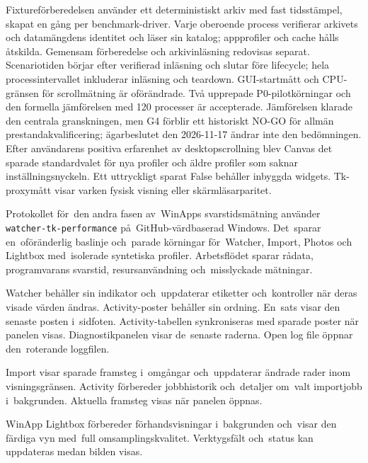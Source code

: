 \documentclass[11pt,a4paper]{article}
\newcommand{\codeword}[1]{\nolinkurl{#1}}
\begin{document}
Fixtureförberedelsen använder ett deterministiskt arkiv med fast tidsstämpel,
skapat en gång per benchmark-driver. Varje oberoende process verifierar arkivets
och datamängdens identitet och läser sin katalog; appprofiler och cache hålls
åtskilda. Gemensam förberedelse och arkivinläsning redovisas separat.
Scenariotiden börjar efter verifierad inläsning och slutar före lifecycle;
hela processintervallet inkluderar inläsning och teardown. GUI-startmått och CPU-gränsen för
scrollmätning är oförändrade. Två upprepade P0-pilotkörningar och den formella jämförelsen med 120 processer
är accepterade. Jämförelsen klarade den centrala granskningen, men G4 förblir
ett historiskt NO-GO för allmän prestandakvalificering; ägarbeslutet den
2026-11-17 ändrar inte den bedömningen. Efter användarens positiva erfarenhet av
desktopscrollning blev Canvas det sparade standardvalet för nya profiler och
äldre profiler som saknar inställningsnyckeln. Ett uttryckligt sparat False
behåller inbyggda widgets. Tk-proxymått visar varken fysisk visning eller
skärmläsarparitet.

Protokollet för~den andra fasen av~WinApps svarstidsmätning använder
\codeword{watcher-tk-performance} på~GitHub-värdbaserad Windows. Det~sparar
en~oföränderlig baslinje och~parade körningar för~Watcher, Import, Photos och
Lightbox med~isolerade syntetiska profiler. Arbetsflödet sparar rådata,
programvarans svarstid, resursanvändning och~misslyckade mätningar.

Watcher behåller sin indikator och~uppdaterar etiketter och~kontroller
när deras visade värden ändras. Activity-poster behåller sin ordning.
En~sats visar den senaste posten i~sidfoten. Activity-tabellen
synkroniseras med sparade poster när panelen visas.
Diagnostikpanelen visar de~senaste raderna. Open log file öppnar
den~roterande loggfilen.

Import visar sparade framsteg i~omgångar och~uppdaterar ändrade rader inom
visningsgränsen. Activity förbereder jobbhistorik och~detaljer om~valt
importjobb i~bakgrunden. Aktuella framsteg visas när panelen öppnas.

WinApp Lightbox förbereder förhandsvisningar i~bakgrunden och~visar den
färdiga vyn med~full omsamplingskvalitet. Verktygsfält och~status kan
uppdateras medan bilden visas.
\end{document}
